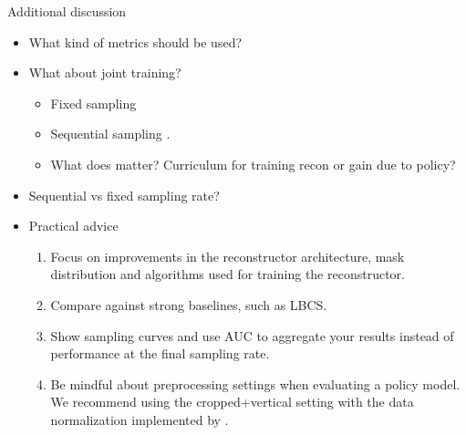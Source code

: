 \begin{frame}{Additional discussion}
    \begin{itemize}
        \item What kind of metrics should be used?
        \item What about joint training? 
        \begin{itemize}
            \item Fixed sampling  \parencite{bahadir2019learning, huijben2020learning}
            \item Sequential sampling \parencite{yin2021end,van2021active,jin2019self}.
            \item What does matter? Curriculum for training recon or gain due to policy?
        \end{itemize}
        \item Sequential vs fixed sampling rate?
        \item Practical advice
        \begin{mdframed}
        \begin{enumerate}
            \item Focus on improvements in the reconstructor architecture, mask distribution and algorithms used for training the reconstructor.
            \item Compare against strong baselines, such as LBCS.
            \item Show sampling curves and use AUC to aggregate your results instead of performance at the final sampling rate.
            \item Be mindful about preprocessing settings when evaluating a policy model. We recommend using the cropped+vertical setting with the data normalization implemented by \cite{zbontarFastMRIOpenDataset2019}.
        \end{enumerate}
        \end{mdframed}
    \end{itemize}
\end{frame}